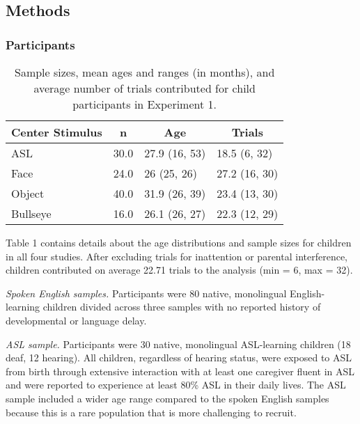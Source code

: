 \documentclass[,man,floatsintext]{apa6}
\begin{document}
\hypertarget{methods}{%
\subsection{Methods}\label{methods}}

\hypertarget{participants}{%
\subsubsection{Participants}\label{participants}}

\begin{table}[tbp]
\begin{center}
\begin{threeparttable}
\caption{\label{tab:trio make participants table}Sample sizes, mean ages and ranges (in months), and average number of trials contributed for child participants in Experiment 1.}
\begin{tabular}{llll}
\toprule
Center Stimulus & \multicolumn{1}{c}{n} & \multicolumn{1}{c}{Age} & \multicolumn{1}{c}{Trials}\\
\midrule
ASL & 30.0 & 27.9 (16, 53) & 18.5 (6, 32)\\
Face & 24.0 & 26 (25, 26) & 27.2 (16, 30)\\
Object & 40.0 & 31.9 (26, 39) & 23.4 (13, 30)\\
Bullseye & 16.0 & 26.1 (26, 27) & 22.3 (12, 29)\\
\bottomrule
\end{tabular}
\end{threeparttable}
\end{center}
\end{table}

Table 1 contains details about the age distributions and sample sizes for children in all four studies. After excluding trials for inattention or parental interference, children contributed on average 22.71 trials to the analysis (min = 6, max = 32).

\emph{Spoken English samples.} Participants were 80 native, monolingual English-learning children divided across three samples with no reported history of developmental or language delay.

\emph{ASL sample.} Participants were 30 native, monolingual ASL-learning children (18 deaf, 12 hearing). All children, regardless of hearing status, were exposed to ASL from birth through extensive interaction with at least one caregiver fluent in ASL and were reported to experience at least 80\% ASL in their daily lives. The ASL sample included a wider age range compared to the spoken English samples because this is a rare population that is more challenging to recruit.
\end{document}
